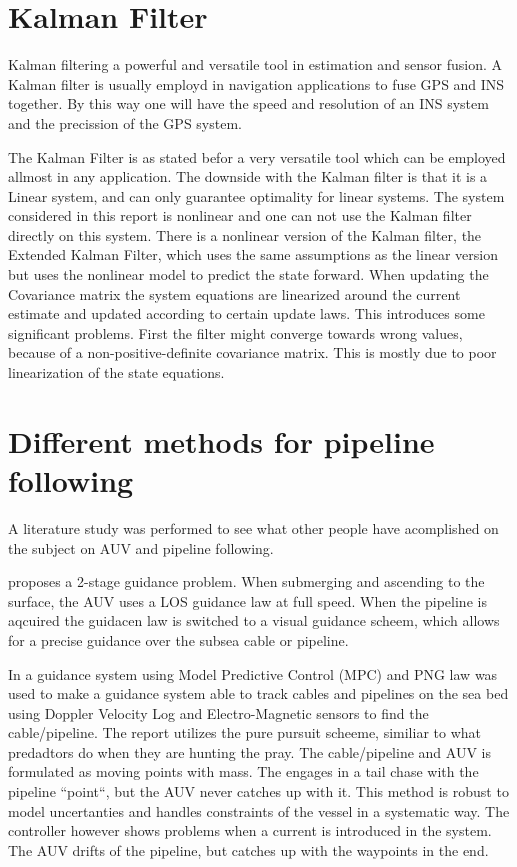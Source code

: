 \section{Kalman Filter}
	Kalman filtering a powerful and versatile tool in estimation and sensor fusion. A Kalman filter is usually 
	employd in navigation applications to fuse GPS and INS together. By this way one will have the speed and 
	resolution of an INS system and the precission of the GPS system. 

	The Kalman Filter is as stated befor a very versatile tool which can be employed allmost in any application. 
	The downside with the Kalman filter is that it is a Linear system, and can only guarantee optimality for linear 
	systems. The system considered in this report is nonlinear and one can not use the Kalman filter directly on 
	this system. There is a nonlinear version of the Kalman filter, the Extended Kalman Filter, which uses the same 
	assumptions as the linear version but uses the nonlinear model to predict the state forward. When updating the 
	Covariance matrix the system equations are linearized around the current estimate and updated according to certain 
	update laws. This introduces some significant problems. First the filter might converge towards wrong values, 
	because of a non-positive-definite covariance matrix. This is mostly due to poor linearization of the 
	state equations. \cite{kalman}
	
	
\section{Different methods for pipeline following}
	A literature study was performed to see what other people have acomplished on the subject on AUV and pipeline following. 
	
	\cite{GuidanceReview} proposes a 2-stage guidance problem. When submerging and ascending to the surface, 
	the AUV uses a LOS guidance law at full speed. When the pipeline is aqcuired the guidacen law is switched 
	to a visual guidance scheem, which allows for a precise guidance over the subsea cable or pipeline. 
		
	In \cite{MPC_pure_pursuit} a guidance system using Model Predictive Control (MPC) and PNG law was used to make 
	a guidance system able to track cables and pipelines on the sea bed using Doppler Velocity Log and Electro-Magnetic 
	sensors to find the cable/pipeline. The report utilizes the pure pursuit scheeme, similiar to what predadtors 
	do when they are hunting the pray. The cable/pipeline and AUV is formulated as moving points with mass. The 
	engages in a tail chase with the pipeline ``point``, but the AUV never catches up with it. This method is robust 
	to model uncertanties and handles constraints of the vessel in a systematic way. The controller however shows 
	problems when a current is introduced in the system. The AUV drifts of the pipeline, but catches up with the 
	waypoints in the end.
	
